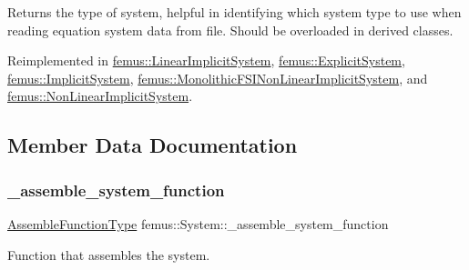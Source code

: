 \begin{DoxyReturn}{Returns}
the type of system, helpful in identifying which system type to use when reading equation system data from file. Should be overloaded in derived classes. 
\end{DoxyReturn}


Reimplemented in \mbox{\hyperlink{classfemus_1_1_linear_implicit_system_a45df3966aab87bd06da49c78897a6648}{femus\+::\+Linear\+Implicit\+System}}, \mbox{\hyperlink{classfemus_1_1_explicit_system_a91f61bd0aa02102fe9af817da96be72b}{femus\+::\+Explicit\+System}}, \mbox{\hyperlink{classfemus_1_1_implicit_system_aee5e08a09a2d289aa777914018931592}{femus\+::\+Implicit\+System}}, \mbox{\hyperlink{classfemus_1_1_monolithic_f_s_i_non_linear_implicit_system_a29bb0bdaf1eec888af05e8e57469faf4}{femus\+::\+Monolithic\+F\+S\+I\+Non\+Linear\+Implicit\+System}}, and \mbox{\hyperlink{classfemus_1_1_non_linear_implicit_system_a8f4727b8b763bdac9f58b4c9dbb097be}{femus\+::\+Non\+Linear\+Implicit\+System}}.



\subsection{Member Data Documentation}
\mbox{\label{classfemus_1_1_system_a712ef55df0fc3bacbf358036be3e10eb}} 
\subsubsection{\texorpdfstring{\+\_\+assemble\+\_\+system\+\_\+function}{\_assemble\_system\_function}}
{\footnotesize\ttfamily \mbox{\hyperlink{classfemus_1_1_system_ae71fa78abbc4b3efe8ef1dc057275b9b}{Assemble\+Function\+Type}} femus\+::\+System\+::\+\_\+assemble\+\_\+system\+\_\+function\hspace{0.3cm}{\ttfamily [protected]}}

Function that assembles the system. \mbox{\label{classfemus_1_1_system_ac137ab0e8e2e10f20633509bf03bbde6}} 
